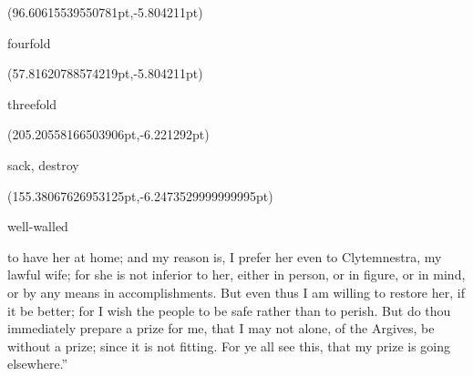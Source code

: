 \documentclass{ransom}
\begin{document}
\begin{foreignpage}
{\begin{textblock*}{49.03049pt}(96.60615539550781pt,\pdfpageheight-152.37759399414062pt-5.804211pt)\parbox[b]{49.03049pt}{\begin{blacktext}\begin{latin}fourfold\end{latin}\end{blacktext}}\end{textblock*}
\begin{textblock*}{35.12817pt}(57.81620788574219pt,\pdfpageheight-152.37759399414062pt-5.804211pt)\parbox[b]{35.12817pt}{\begin{blacktext}\begin{latin}threefold\end{latin}\end{blacktext}}\end{textblock*}
\begin{textblock*}{58.8614pt}(205.20558166503906pt,\pdfpageheight-125.37759399414062pt-6.221292pt)\parbox[b]{58.8614pt}{\begin{blacktext}\begin{latin}sack, destroy\end{latin}\end{blacktext}}\end{textblock*}
\begin{textblock*}{46.16313pt}(155.38067626953125pt,\pdfpageheight-125.37759399414062pt-6.2473529999999995pt)\parbox[b]{46.16313pt}{\begin{blacktext}\begin{latin}well-walled\end{latin}\end{blacktext}}\end{textblock*}
 }
\end{foreignpage}


to have her at home; and my reason is, I
prefer her even to Clytemnestra, my lawful wife; for she is not
inferior to her, either in person, or in figure, or in mind, or by any
means in accomplishments. But even thus I am willing to restore her, if
it be better; for I wish the people to be safe rather than to perish.
But do thou immediately prepare a prize for me, that I may not alone,
of the Argives, be without a prize; since it is not fitting. For ye all
see this, that my prize is going elsewhere.”
\end{document}
